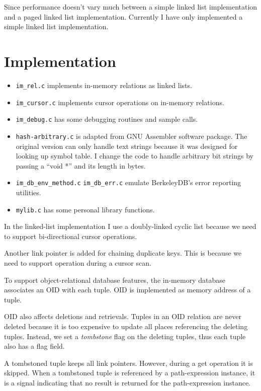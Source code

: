 Since performance doesn't vary much between a simple linked list
implementation and a paged linked list implementation.  Currently I
have only implemented a simple linked list implementation.

\section{Implementation}
\begin{itemize}
\item {\tt im\_rel.c} implements in-memory relations as linked lists.
\item {\tt im\_cursor.c} implements cursor operations on in-memory
      relations.
\item {\tt im\_debug.c} has some debugging routines and sample calls.
\item {\tt hash-arbitrary.c} is adapted from GNU Assembler software
      package.  The original version can only handle text strings
      because it was designed for looking up symbol table.  I change
      the code to handle arbitrary bit strings by passing a ``void *''
      and its length in bytes.
\item {\tt im\_db\_env\_method.c} {\tt im\_db\_err.c} emulate BerkeleyDB's
      error reporting utilities.
\item {\tt mylib.c} has some personal library functions.
\end{itemize}

In the linked-list implementation I use a doubly-linked cyclic list
because we need to support bi-directional cursor operations.

Another link pointer is added for chaining duplicate keys.  This is
because we need to support {\DBNEXTDUP} operation during a cursor
scan.

To support object-relational database features, the in-memory database
associates an OID with each tuple.  OID is implemented as memory
address of a tuple.

OID also affects deletions and retrievals.  Tuples in an OID relation
are never deleted because it is too expensive to update all places
referencing the deleting tuples.  Instead, we set a {\em tombstone}
flag on the deleting tuples, thus each tuple also has a flag field.

A tombstoned tuple keeps all link pointers.  However, during a get
operation it is skipped.  When a tombstoned tuple is referenced by a
path-expression instance, it is a signal indicating that no result is
returned for the path-expression instance.
\newpage
